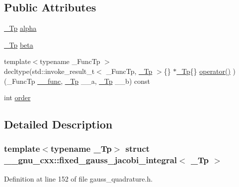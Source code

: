 \subsection*{Public Attributes}
\begin{DoxyCompactItemize}
\item 
\hyperlink{namespace____gnu__cxx_a3b19a9c800ca194374ef9172290f7d79}{\+\_\+\+Tp} \hyperlink{struct____gnu__cxx_1_1fixed__gauss__jacobi__integral_a2d9b81150e8fed046b6753551e9ce0e1}{alpha}
\item 
\hyperlink{namespace____gnu__cxx_a3b19a9c800ca194374ef9172290f7d79}{\+\_\+\+Tp} \hyperlink{struct____gnu__cxx_1_1fixed__gauss__jacobi__integral_aa9e160852c8912532deda29fae96824a}{beta}
\item 
{\footnotesize template$<$typename \+\_\+\+Func\+Tp $>$ }\\decltype(std\+::invoke\+\_\+result\+\_\+t$<$ \+\_\+\+Func\+Tp, \hyperlink{namespace____gnu__cxx_a3b19a9c800ca194374ef9172290f7d79}{\+\_\+\+Tp} $>$\{\} $\ast$\hyperlink{namespace____gnu__cxx_a3b19a9c800ca194374ef9172290f7d79}{\+\_\+\+Tp}\{\} \hyperlink{struct____gnu__cxx_1_1fixed__gauss__jacobi__integral_ad20389e68e1c98098f892b118e614498}{operator()} )(\+\_\+\+Func\+Tp \hyperlink{namespace____gnu__cxx_af2b2f0c7a2ae72b922b1afefae5a65b2}{\+\_\+\+\_\+func}, \hyperlink{namespace____gnu__cxx_a3b19a9c800ca194374ef9172290f7d79}{\+\_\+\+Tp} \+\_\+\+\_\+a, \hyperlink{namespace____gnu__cxx_a3b19a9c800ca194374ef9172290f7d79}{\+\_\+\+Tp} \+\_\+\+\_\+b) const
\item 
int \hyperlink{struct____gnu__cxx_1_1fixed__gauss__jacobi__integral_ae5f494962a95203a0f799f039e4b6b33}{order}
\end{DoxyCompactItemize}


\subsection{Detailed Description}
\subsubsection*{template$<$typename \+\_\+\+Tp$>$\newline
struct \+\_\+\+\_\+gnu\+\_\+cxx\+::fixed\+\_\+gauss\+\_\+jacobi\+\_\+integral$<$ \+\_\+\+Tp $>$}



Definition at line 152 of file gauss\+\_\+quadrature.\+h.



